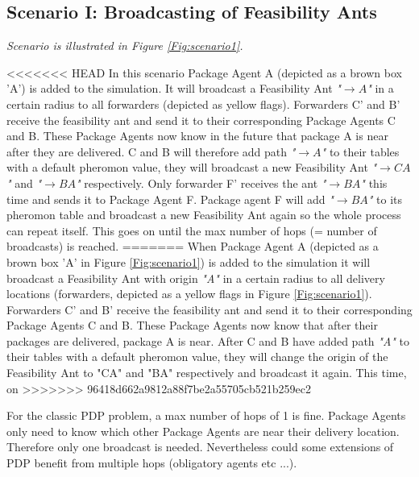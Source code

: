 \subsection*{Scenario I: Broadcasting of Feasibility Ants}
\label{subsec:scenario1}
\npar \textit{Scenario is illustrated in Figure \ref{Fig:scenario1}.}

<<<<<<< HEAD
\npar In this scenario Package Agent A (depicted as a brown box 'A') is added to the simulation. It will broadcast a Feasibility Ant \textit{"$\rightarrow A$"} in a certain radius to all forwarders (depicted as yellow flags). Forwarders C' and B' receive the feasibility ant and send it to their corresponding Package Agents C and B. These Package Agents now know in the future that package A is near after they are delivered. C and B will therefore add path \textit{"$\rightarrow A$"} to their tables with a default pheromon value, they will broadcast a new Feasibility Ant \textit{"$\rightarrow CA$"} and \textit{"$\rightarrow BA$"} respectively. Only forwarder F' receives the ant \textit{"$\rightarrow BA$"} this time and sends it to Package Agent F. Package agent F will add \textit{"$\rightarrow BA$"} to its pheromon table and broadcast a new Feasibility Ant again so the whole process can repeat itself. This goes on until the max number of hops (= number of broadcasts) is reached.
=======
When Package Agent A (depicted as a brown box 'A' in Figure \ref{Fig:scenario1})
is added to the simulation it will broadcast a Feasibility Ant with origin
\emph{"A"} in a certain radius to all delivery locations (forwarders, depicted
as a yellow flags in Figure \ref{Fig:scenario1}). Forwarders C' and B' receive
the feasibility ant and send it to their corresponding Package Agents C and B.
These Package Agents now know that after their packages are delivered, package A
is near. After C and B have added path \emph{"A"} to their tables with a default
pheromon value, they will change the origin of the Feasibility Ant to "CA" and
"BA" respectively and broadcast it again. This time, on
>>>>>>> 96418d662a9812a88f7be2a55705cb521b259ec2

\npar For the classic PDP problem, a max number of hops of 1 is fine. Package Agents only need to know which other Package Agents are near their delivery location. Therefore only one broadcast is needed. Nevertheless could some extensions of PDP benefit from multiple hops (obligatory agents etc ...).


